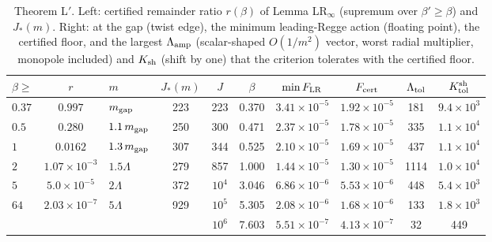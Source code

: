 \documentclass[aps,prl,onecolumn,superscriptaddress,nofootinbib]{revtex4-2}
\begin{document}
\begin{table}[!htbp]
\caption{\label{tab:thmL}Theorem L$'$. Left: certified remainder ratio $r(\beta)$ of Lemma LR$_\infty$ (supremum over
$\beta'\ge\beta$) and $J_*(m)$. Right: at the gap (twist edge), the minimum leading-Regge action (floating point), the certified
floor, and the largest $\Lambda_{\rm amp}$ (scalar-shaped $O(1/m^2)$ vector, worst radial multiplier, monopole included) and
$K_{\rm sh}$ (shift by one) that the criterion tolerates with the certified floor.}
\footnotesize
\begin{ruledtabular}
\begin{tabular}{lc|lc|cccccc}
$\beta\ge$ & $r$ & $m$ & $J_*(m)$ & $J$ & $\beta$ & $\min F_{\rm LR}$ & $F_{\rm cert}$ & $\Lambda_{\rm tol}$ & $K^{\rm sh}_{\rm tol}$\\\hline
$0.37$ & $0.997$ & $m_{\rm gap}$ & 223 & 223 & 0.370 & $3.41\times10^{-5}$ & $1.92\times10^{-5}$ & 181 & $9.4\times10^3$\\
$0.5$ & $0.280$ & $1.1\,m_{\rm gap}$ & 250 & 300 & 0.471 & $2.37\times10^{-5}$ & $1.78\times10^{-5}$ & 335 & $1.1\times10^4$\\
$1$ & $0.0162$ & $1.3\,m_{\rm gap}$ & 307 & 344 & 0.525 & $2.10\times10^{-5}$ & $1.69\times10^{-5}$ & 437 & $1.1\times10^4$\\
$2$ & $1.07\times10^{-3}$ & $1.5\Lambda$ & 279 & 857 & 1.000 & $1.44\times10^{-5}$ & $1.30\times10^{-5}$ & 1114 & $1.0\times10^4$\\
$5$ & $5.0\times10^{-5}$ & $2\Lambda$ & 372 & $10^4$ & 3.046 & $6.86\times10^{-6}$ & $5.53\times10^{-6}$ & 448 & $5.4\times10^3$\\
$64$ & $2.03\times10^{-7}$ & $5\Lambda$ & 929 & $10^5$ & 5.305 & $2.08\times10^{-6}$ & $1.68\times10^{-6}$ & 133 & $1.8\times10^3$\\
 & & & & $10^6$ & 7.603 & $5.51\times10^{-7}$ & $4.13\times10^{-7}$ & 32 & 449\\
\end{tabular}
\end{ruledtabular}
\end{table}
\end{document}
